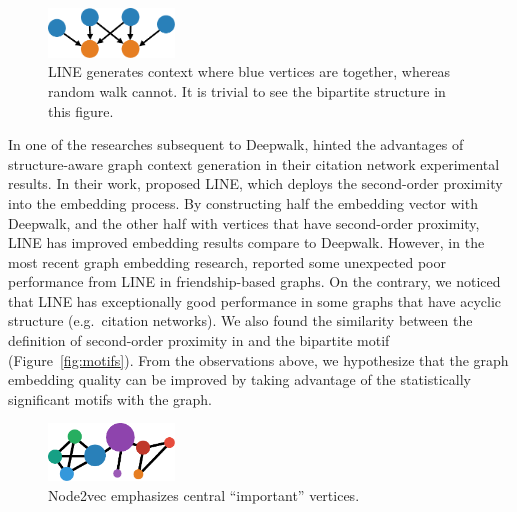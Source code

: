 \documentclass[letterpaper]{article}
\begin{document}
            \begin{figure}
                \centering
                \includegraphics[width=0.3\textwidth]{fig3_line}
                \caption{LINE generates context where blue vertices are together, whereas random walk cannot.
                It is trivial to see the bipartite structure in this figure.}
                \label{fig:line}
            \end{figure}

            In one of the researches subsequent to Deepwalk, \cite{line} hinted the advantages 
            of structure-aware graph context generation in their citation network experimental 
            results. In their work, \citeauthor{line} proposed LINE, which deploys the
            second-order proximity into the embedding process. By constructing half the embedding
            vector with Deepwalk, and the other half with vertices that have second-order proximity,
            LINE has improved embedding results compare to Deepwalk. However, in the most recent
            graph embedding research, \cite{node2vec} reported some unexpected poor performance
            from LINE in friendship-based graphs. On the contrary, we noticed that 
            LINE has exceptionally good performance in some graphs that have acyclic structure 
            (e.g.\ citation networks). We also found the similarity between the definition of 
            second-order proximity in \cite{line} and the bipartite motif (Figure~\ref{fig:motifs}).
            From the observations above, we hypothesize that the graph embedding quality can be
            improved by taking advantage of the statistically significant motifs with the graph.

            \begin{figure}
                \centering
                \includegraphics[width=0.3\textwidth]{fig4_n2v}
                \caption{Node2vec emphasizes central ``important'' vertices.}
                \label{fig:n2v}
            \end{figure}
\end{document}
